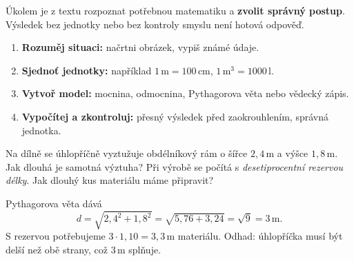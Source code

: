 \documentclass[11pt,a4paper]{article}
\begin{document}

Úkolem je z textu rozpoznat potřebnou matematiku a \textbf{zvolit správný postup}.
Výsledek bez jednotky nebo bez kontroly smyslu není hotová odpověď.

\begin{definiceBox}[title={Postup - Řešení slovní a technické úlohy}]
\begin{enumerate}[label=\arabic*.]
\item \textbf{Rozuměj situaci:} načrtni obrázek, vypiš známé údaje.
\item \textbf{Sjednoť jednotky:} například $1\,\mathrm{m}=100\,\mathrm{cm}$,
$1\,\mathrm{m}^3=1000\,\mathrm{l}$.
\item \textbf{Vytvoř model:} mocnina, odmocnina, Pythagorova věta nebo vědecký zápis.
\item \textbf{Vypočítej a zkontroluj:} přesný výsledek před zaokrouhlením, správná jednotka.
\end{enumerate}
\end{definiceBox}

\begin{prikladReseniBox}[title={Příklad 1}]
Na dílně se úhlopříčně vyztužuje obdélníkový rám o šířce
$2{,}4\,\mathrm m$ a výšce $1{,}8\,\mathrm m$. Jak dlouhá je samotná
výztuha? Při výrobě se počítá s \emph{desetiprocentní rezervou délky}.
Jak dlouhý kus materiálu máme připravit?
\tcblower
\begin{center}
\end{center}
Pythagorova věta dává
\[
d=\sqrt{2{,}4^2+1{,}8^2}=\sqrt{5{,}76+3{,}24}=\sqrt9=3\,\mathrm m.
\]
S rezervou potřebujeme $3\cdot1{,}10=\boxed{3{,}3\,\mathrm m}$ materiálu.
Odhad: úhlopříčka musí být delší než obě strany, což $3\,\mathrm m$ splňuje.
\end{prikladReseniBox}
\end{document}
